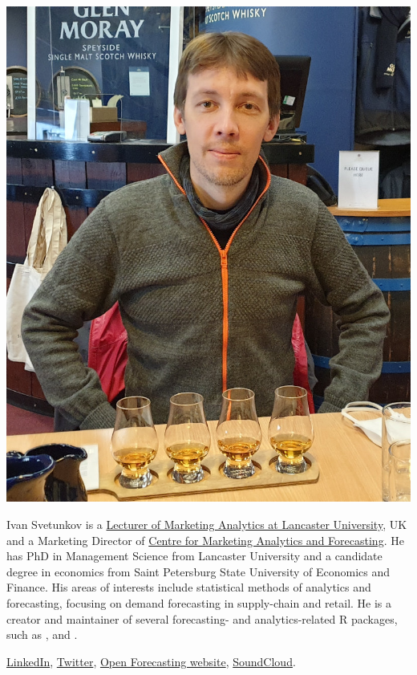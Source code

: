 \documentclass[
]{book}
\theoremstyle{definition}
\theoremstyle{definition}
\theoremstyle{definition}
\theoremstyle{definition}
\theoremstyle{remark}
\begin{document}
\begin{center}\includegraphics[width=0.6\linewidth]{images/IvanSvetunkov-web} \end{center}

Ivan Svetunkov is a \href{https://www.lancaster.ac.uk/lums/people/ivan-svetunkov}{Lecturer of Marketing Analytics at Lancaster University}, UK and a Marketing Director of \href{https://www.lancaster.ac.uk/lums/cmaf/}{Centre for Marketing Analytics and Forecasting}. He has PhD in Management Science from Lancaster University and a candidate degree in economics from Saint Petersburg State University of Economics and Finance. His areas of interests include statistical methods of analytics and forecasting, focusing on demand forecasting in supply-chain and retail. He is a creator and maintainer of several forecasting- and analytics-related R packages, such as \citet{R-greybox}, \citet{R-smooth} and \citet{R-legion}.

\href{https://www.linkedin.com/in/isvetunkov/}{LinkedIn}, \href{https://twitter.com/iSvetunkov}{Twitter}, \href{https://forecasting.svetunkov.ru/}{Open Forecasting website}, \href{https://soundcloud.com/ivan-svetunkov}{SoundCloud}.

  
\end{document}
